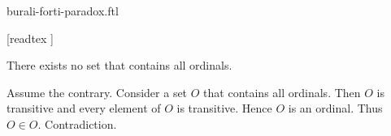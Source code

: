 \documentclass{stex}
\begin{document}
\begin{smodule}{burali-forti-paradox.ftl}
  \begin{forthel}
    [readtex ]
  \end{forthel}

  \begin{ftheorem}[label=burali_forti_paradox,title=Burali-Forti's Paradox]
    There exists no set that contains all ordinals.
  \end{ftheorem}
  \begin{fproof}[method=contradiction]
    Assume the contrary.
    Consider a set $O$ that contains all ordinals.
    Then $O$ is transitive and every element of $O$ is transitive.
    Hence $O$ is an ordinal.
    Thus $O \in O$.
    Contradiction.
  \end{fproof}
\end{smodule}
\end{document}

